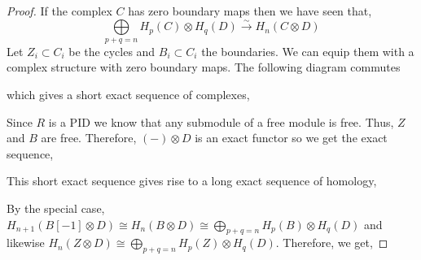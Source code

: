\documentclass[12pt]{extarticle}
\begin{document}
\begin{proof}
If the complex $C$ has zero boundary maps then we have seen that,
\[ \bigoplus\limits_{p+q = n} H_p(C) \otimes H_q(D) \xrightarrow{\sim} H_n(C \otimes D) \]
Let $Z_i \subset C_i$ be the cycles and $B_i \subset C_i$ the boundaries. We can equip them with a complex structure with zero boundary maps. The following diagram commutes 
\begin{center}
\end{center}
which gives a short exact sequence of complexes,
\begin{center}
\end{center}
Since $R$ is a PID we know that any submodule of a free module is free. Thus, $Z$ and $B$ are free. Therefore, $(-) \otimes D$ is an exact functor so we get the exact sequence,
\begin{center}
\end{center}
This short exact sequence gives rise to a long exact sequence of homology,
\begin{center}
\end{center}
By the special case, $H_{n+1}(B[-1] \otimes D) \cong H_{n}(B \otimes D) \cong \bigoplus\limits_{p+q = n} H_{p}(B) \otimes H_{q}(D)$ and likewise $H_n(Z \otimes D) \cong \bigoplus\limits_{p+q = n} H_p(Z) \otimes H_q(D)$. Therefore, we get, 

\end{proof}
\end{document}
